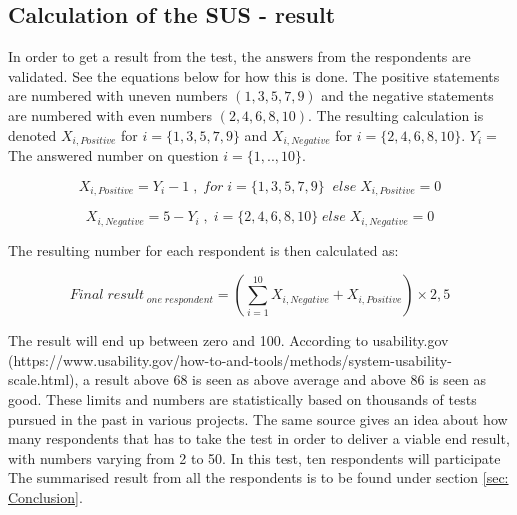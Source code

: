 \documentclass[12pt]{article}
\begin{document}
    \subsection{Calculation of the SUS - result}
    In order to get a result from the test, the answers from the respondents are validated. See the equations below for how this is done. The positive statements are numbered with uneven numbers $(1, 3, 5, 7, 9)$ and the negative statements are numbered with even numbers $(2, 4, 6, 8, 10)$. The resulting calculation is denoted $X_{i,Positive}$ for $ i = \{1,3,5,7,9\}$ and $X_{i,Negative}$ for $ i = \{2,4,6,8,10\}$. $Y_i = $ The answered number on question $ i = \{1,..,10\}$.

     \begin{equation}
        X_{i,Positive} = Y_i - 1 \;, \;for \;i = \{1,3,5,7,9\} \; \;else\;  X_{i,Positive} = 0
     \end{equation}
    
     \begin{equation}
         X_{i,Negative} = 5 - Y_i \;,\; i = \{2,4,6,8,10\}  \;else\;  X_{i,Negative} = 0
     \end{equation}
     
\begin{center}
    The resulting number for each respondent is then calculated as: 
\end{center}     
     
     \begin{equation}
         {Final\;result}_{\;one\;respondent} =  (\sum_{i=1}^{10} X_{i,Negative} + X_{i,Positive} ) \times 2,5 
     \end{equation}
   
    The result will end up between zero and 100. According to usability.gov (https://www.usability.gov/how-to-and-tools/methods/system-usability-scale.html), a result above 68 is seen as above average and above 86 is seen as good. These limits and numbers are statistically based on thousands of tests pursued in the past in various projects. The same source gives an idea about how many respondents that has to take the test in order to deliver a viable end result, with numbers varying from 2 to 50. In this test, ten respondents will participate The summarised result from all the respondents is to be found under section \ref{sec: Conclusion}.
   
    \label{ref: Calculations}
\end{document}
